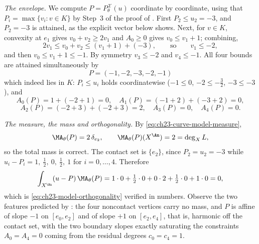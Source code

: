 \begin{example}
\emph{The envelope.}  We compute \(P=P^{\mathcal X}_\theta(u)\) coordinate
by coordinate, using that \(P_i=\max\{v_i:v\in K\}\) by Step~3 of the proof
of .  First \(P_2\leq u_2=-3\), and
\(P_2=-3\) is attained, as the explicit vector below shows.  Next, for
\(v\in K\), convexity at \(e_1\) gives \(v_0+v_2\geq2v_1\) and \(A_0\geq0\)
gives \(v_0\leq v_1+1\); combining,
\[
 2v_1\leq v_0+v_2\leq (v_1+1)+(-3),
 \qquad\text{so}\qquad v_1\leq-2 ,
\]
and then \(v_0\leq v_1+1\leq-1\).  By symmetry \(v_3\leq-2\) and
\(v_4\leq-1\).  All four bounds are attained simultaneously by
\[
 \boxed{\ P=(-1,-2,-3,-2,-1)\ }
\]
which indeed lies in \(K\): \(P_i\leq u_i\) holds coordinatewise
(\(-1\leq0\), \(-2\leq-\tfrac32\), \(-3\leq-3\)), and
\[
 A_0(P)=1+(-2+1)=0,\quad
 A_1(P)=(-1+2)+(-3+2)=0,
\]
\[
 A_2(P)=(-2+3)+(-2+3)=2,\quad
 A_3(P)=0,\quad
 A_4(P)=0 .
\]

\emph{The measure, the mass and orthogonality.}  By
\eqref{eq:ch23-curve-model-measure},
\[
 \MA_\theta(P)=2\,\delta_{e_2},
 \qquad
 \MA_\theta(P)(X^{\An})=2=\deg_XL ,
\]
so the total mass is correct.  The contact set is \(\{e_2\}\), since
\(P_2=u_2=-3\) while \(u_i-P_i=1,\ \tfrac12,\ 0,\ \tfrac12,\ 1\) for
\(i=0,\ldots,4\).  Therefore
\[
 \int_{X^{\An}}(u-P)\,\MA_\theta(P)
 =1\cdot0+\tfrac12\cdot0+0\cdot2+\tfrac12\cdot0+1\cdot0=0 ,
\]
which is \eqref{eq:ch23-model-orthogonality} verified in numbers.  Observe
the two features predicted by
: the four noncontact vertices
carry no mass, and \(P\) is affine of slope \(-1\) on \([e_0,e_2]\) and of
slope \(+1\) on \([e_2,e_4]\), that is, harmonic off the contact set, with
the two boundary slopes exactly saturating the constraints
\(A_0=A_4=0\) coming from the residual degrees \(c_0=c_4=1\).


\end{example}
